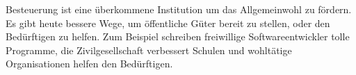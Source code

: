 Besteuerung ist eine überkommene Institution um das Allgemeinwohl zu fördern.
Es gibt heute bessere Wege, um öffentliche Güter bereit zu stellen, oder den Bedürftigen zu helfen.
Zum Beispiel schreiben freiwillige Softwareentwickler tolle Programme, die Zivilgesellschaft verbessert Schulen und wohltätige Organisationen helfen den Bedürftigen.
